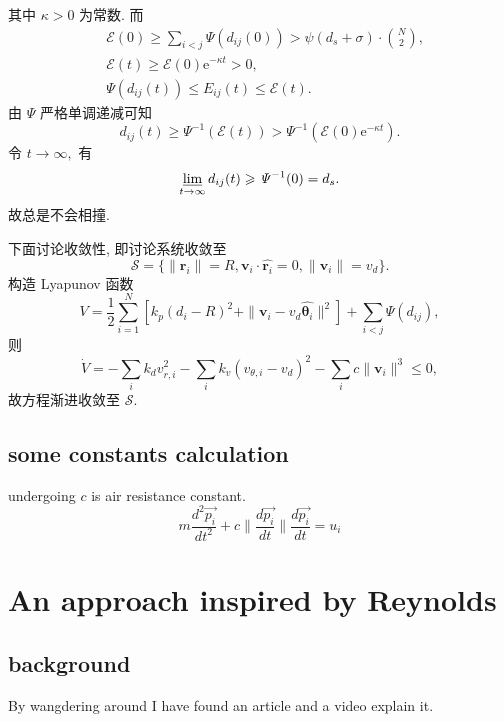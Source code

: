 \documentclass{article}
\theoremstyle{definition} %
\begin{document}
其中 $\kappa>0$ 为常数. 而
\begin{align*}
     & \mathcal{E}(0)\geqslant\sum_{i<j}\mathit{\Psi}(d_{ij}(0))>\psi(d_s+\sigma)\cdot\binom{N}{2}, \\
     & \mathcal{E}(t)\geqslant\mathcal{E}(0)\mathrm{e}^{-\kappa t}>0,                               \\
     & \mathit{\Psi}(d_{ij}(t))\leqslant E_{ij}(t)\leqslant\mathcal{E}(t).
\end{align*}
由 $\mathit{\Psi}$ 严格单调递减可知
\begin{equation*}
    d_{ij}(t)\geqslant\mathit{\Psi}^{-1}(\mathcal{E}(t))>\mathit{\Psi}^{-1}(\mathcal{E}(0)\mathrm{e}^{-\kappa t}).
\end{equation*}
令 $t\to\infty,$ 有
\begin{equation*}
    \varliminf_{t\to\infty}d_{ij}(t)\geqslant\mathit{\Psi}^{-1}(0)=d_s.
\end{equation*}
故总是不会相撞.\par
下面讨论收敛性, 即讨论系统收敛至
\begin{equation*}
    \mathcal{S}=\{\|\boldsymbol{r}_i\|=R,\boldsymbol{v}_i\cdot\widehat{\boldsymbol{r}_i}=0,\|\boldsymbol{v}_i\|=v_d\}.
\end{equation*}
构造 Lyapunov 函数
\begin{equation*}
    V=\frac{1}{2}\sum_{i=1}^N[k_p(d_i-R)^2+\|\boldsymbol{v}_i-v_d\widehat{\boldsymbol{\theta}_i}\|^2]+\sum_{i<j}\mathit{\Psi}(d_{ij}),
\end{equation*}
则
\begin{equation*}
    \dot{V}=-\sum_{i}k_dv_{r,i}^2-\sum_ik_v(v_{\theta,i}-v_d)^2-\sum_ic\|\boldsymbol{v}_i\|^3\leqslant0,
\end{equation*}
故方程渐进收敛至 $\mathcal{S}$.

\subsection{some constants calculation}
undergoing
\(c\) is air resistance constant.
\[
    m\frac{d^2 \vec{p_i}}{dt^2}+c\|\frac{d\vec{p_i}}{dt}\|\frac{d\vec{p_i}}{dt}=u_i
\]

\section{An approach inspired by Reynolds}
\subsection{background}
By wangdering around I have found an
article\cite[ReynoldsMethod]{10.1145/37402.37406}
and a video explain it\cite{xpinman}.
\end{document}
